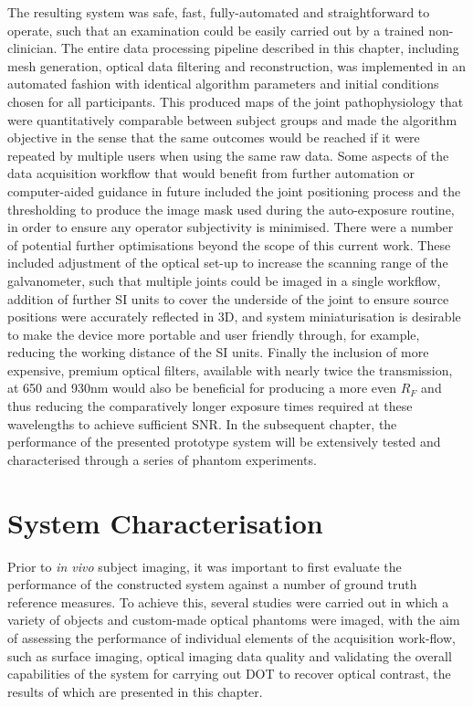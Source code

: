 \documentclass[twoside]{bhamthesis}
\theoremstyle{definition}
\begin{document}
The resulting system was safe, fast, fully-automated and straightforward to operate, such that an examination could be easily carried out by a trained non-clinician. The entire data processing pipeline described in this chapter, including mesh generation, optical data filtering and reconstruction, was implemented in an automated fashion with identical algorithm parameters and initial conditions chosen for all participants. This produced maps of the joint pathophysiology that were quantitatively comparable between subject groups and made the algorithm objective in the sense that the same outcomes would be reached if it were repeated by multiple users when using the same raw data. Some aspects of the data acquisition workflow that would benefit from further automation or computer-aided guidance in future included the joint positioning process and the thresholding to produce the image mask used during the auto-exposure routine, in order to ensure any operator subjectivity is minimised. There were a number of potential further optimisations beyond the scope of this current work. These included adjustment of the optical set-up to increase the scanning range of the galvanometer, such that multiple joints could be imaged in a single workflow, addition of further SI units to cover the underside of the joint to ensure source positions were accurately reflected in 3D, and system miniaturisation is desirable to make the device more portable and user friendly through, for example, reducing the working distance of the SI units. Finally the inclusion of more expensive, premium optical filters, available with nearly twice the transmission, at 650 and 930nm would also be beneficial for producing a more even $R_F$ and thus reducing the comparatively longer exposure times required at these wavelengths to achieve sufficient SNR. In the subsequent chapter, the performance of the presented prototype system will be extensively tested and characterised through a series of phantom experiments. 

\chapter{System Characterisation}
\label{chapter:System_Characterisation}

Prior to \textit{in vivo} subject imaging, it was important to first evaluate the performance of the constructed system against a number of ground truth reference measures. To achieve this, several studies were carried out in which a variety of objects and custom-made optical phantoms were imaged, with the aim of assessing the performance of individual elements of the acquisition work-flow, such as surface imaging, optical imaging data quality and validating the overall capabilities of the system for carrying out DOT to recover optical contrast, the results of which are presented in this chapter.
\end{document}
